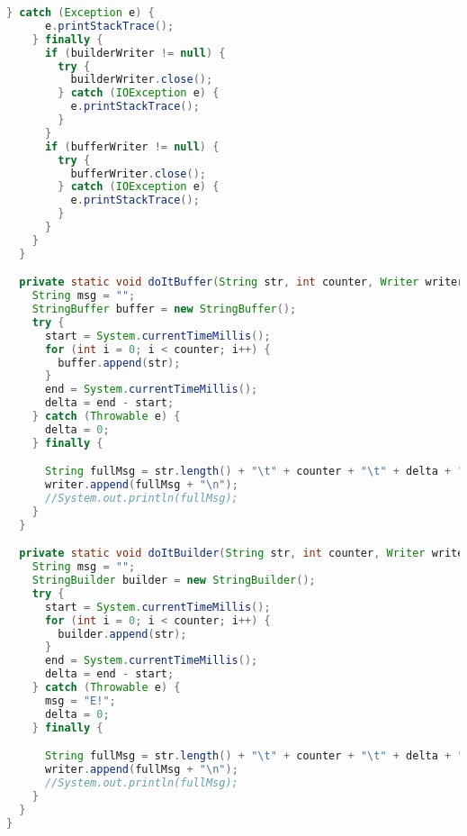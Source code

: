 \begin{lstlisting}[language=Java]
    } catch (Exception e) {
      e.printStackTrace();
    } finally {
      if (builderWriter != null) {
        try {
          builderWriter.close();
        } catch (IOException e) {
          e.printStackTrace();
        }
      }
      if (bufferWriter != null) {
        try {
          bufferWriter.close();
        } catch (IOException e) {
          e.printStackTrace();
        }
      }
    }
  }

  private static void doItBuffer(String str, int counter, Writer writer) throws IOException {
    String msg = "";
    StringBuffer buffer = new StringBuffer();
    try {
      start = System.currentTimeMillis();
      for (int i = 0; i < counter; i++) {
        buffer.append(str);
      }
      end = System.currentTimeMillis();
      delta = end - start;
    } catch (Throwable e) {
      delta = 0;
    } finally {

      String fullMsg = str.length() + "\t" + counter + "\t" + delta + "\t" + fmt.format(((double) delta / (double) counter)) + "\tbuffer\t" + msg;
      writer.append(fullMsg + "\n");
      //System.out.println(fullMsg);
    }
  }

  private static void doItBuilder(String str, int counter, Writer writer) throws IOException {
    String msg = "";
    StringBuilder builder = new StringBuilder();
    try {
      start = System.currentTimeMillis();
      for (int i = 0; i < counter; i++) {
        builder.append(str);
      }
      end = System.currentTimeMillis();
      delta = end - start;
    } catch (Throwable e) {
      msg = "E!";
      delta = 0;
    } finally {

      String fullMsg = str.length() + "\t" + counter + "\t" + delta + "\t" + fmt.format(((double) delta / (double) counter)) + "\tbuilder\t" + msg;
      writer.append(fullMsg + "\n");
      //System.out.println(fullMsg);
    }
  }
}
\end{lstlisting}